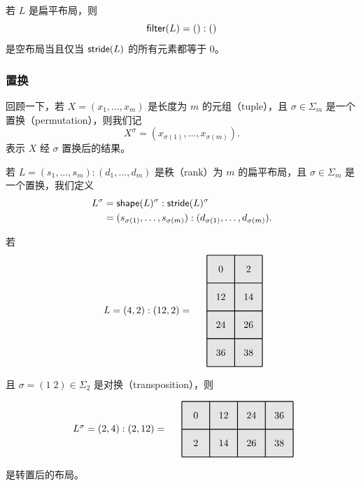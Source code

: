 \begin{example}
    若 $L$ 是扁平布局，则
    \[
    \mathsf{filter}(L) = ():()
    \]
    是空布局当且仅当 $\mathsf{stride}(L)$ 的所有元素都等于 $0$。
\end{example}



\subsubsection{置换}

回顾一下，若 $X = (x_1,\dots,x_m)$ 是长度为 $m$ 的元组（tuple），且 $\sigma \in \Sigma_m$ 是一个置换（permutation），则我们记
\[
X^\sigma = (x_{\sigma(1)},\dots,x_{\sigma(m)}).
\]
表示 $X$ 经 $\sigma$ 置换后的结果。

\begin{definition}\label{definitionofpermutationofflatlayout} 若 $L=(s_1,\dots,s_m):(d_1,\dots,d_m)$ 是秩（rank）为 $m$ 的扁平布局，且 $\sigma \in \Sigma_m$ 是一个置换，我们定义
\begin{align*}
L^\sigma & =  \mathsf{shape}(L)^\sigma : \mathsf{stride}(L)^\sigma \\
& = (s_{\sigma(1)},\dots,s_{\sigma(m)}) : (d_{\sigma(1)},\dots,d_{\sigma(m)}).
\end{align*}
\end{definition}

\begin{example}
    若
\[
\begin{tikzpicture}[x={(0cm,-1cm)},y={(1cm,0cm)},every node/.style={minimum size=1cm, outer sep=0pt}]

\node[fill=gray!20] at (0,0) {0};
\node[fill=gray!20] at (0,1) {2};
\node[fill=gray!20] at (1,0) {12};
\node[fill=gray!20] at (1,1) {14};
\node[fill=gray!20] at (2,0) {24};
\node[fill=gray!20] at (2,1) {26};
\node[fill=gray!20] at (3,0) {36};
\node[fill=gray!20] at (3,1) {38};
\draw[color=black,thick,shift={(-0.5,-0.5)}] (0,0) grid (4,2);

\node[anchor=east] at (1.5,-1) {$L = (4,2):(12,2) =$ };
\end{tikzpicture}
\]
    且 $\sigma = (1\; 2) \in \Sigma_2$ 是对换（transposition），则

\[
\begin{tikzpicture}[x={(0cm,-1cm)},y={(1cm,0cm)},every node/.style={minimum size=1cm, outer sep=0pt}]

\node[fill=gray!20] at (0,0) {0};
\node[fill=gray!20] at (0,1) {12};
\node[fill=gray!20] at (0,2) {24};
\node[fill=gray!20] at (0,3) {36};
\node[fill=gray!20] at (1,0) {2};
\node[fill=gray!20] at (1,1) {14};
\node[fill=gray!20] at (1,2) {26};
\node[fill=gray!20] at (1,3) {38};
\draw[color=black,thick,shift={(-0.5,-0.5)}] (0,0) grid (2,4);

\node[anchor = east] at (0.5,-1) {$L^\sigma = (2,4):(2,12) = $};
\end{tikzpicture}
\]
是转置后的布局。
\end{example}

